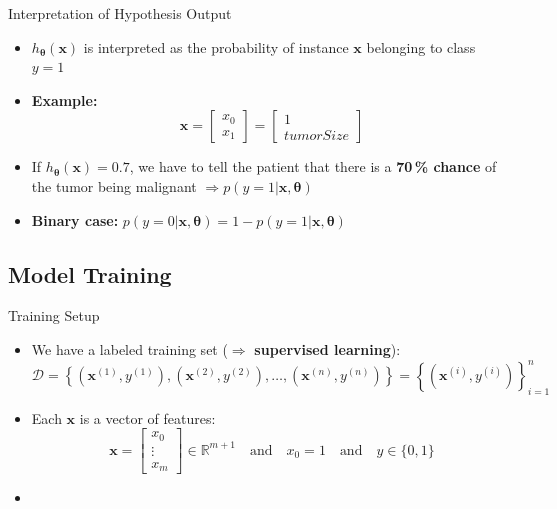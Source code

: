 \begin{frame}{Interpretation of Hypothesis Output}{}
	\begin{itemize}
		\item $h_{\bm{\theta}}(\bm{x})$ is interpreted as the probability of instance $\bm{x}$ belonging to class $y = 1$
		\item \textbf{Example:}
		\begin{equation}
			\bm{x} = \begin{bmatrix} x_0 \\ x_1 \end{bmatrix} = \begin{bmatrix} 1 \\ tumorSize \end{bmatrix}
		\end{equation}
		\vspace*{1mm}
		\item If $h_{\bm{\theta}}(\bm{x}) = 0.7$, we have to tell the patient that there
			is a \textbf{70\,\% chance} of the tumor being malignant $\Rightarrow p(y = 1 \vert \bm{x}, \bm{\theta})$
		\item \textbf{Binary case:} $p(y = 0 \vert \bm{x}, \bm{\theta}) = 1 - p(y = 1 \vert \bm{x}, \bm{\theta})$
	\end{itemize}
\end{frame}


\subsection{Model Training}

\begin{frame}{Training Setup}{}
	\begin{itemize}
		\item We have a labeled training set ($\Rightarrow$ \textbf{supervised learning}):
		\begin{equation}
			\mathcal{D} = 
				\left\{ (\bm{x}^{(1)}, y^{(1)}), (\bm{x}^{(2)}, y^{(2)}), \dots, (\bm{x}^{(n)}, y^{(n)}) \right\}
				= \left\{ (\bm{x}^{(i)}, y^{(i)}) \right\}_{i=1}^n
		\end{equation}
		\item Each $\bm{x}$ is a vector of features:
		\begin{equation}
			\bm{x} = \begin{bmatrix} x_0 \\ \vdots \\ x_{m} \end{bmatrix} \in \mathbb{R}^{m+1}
			\quad \text{and} \quad x_0 = 1 \quad \text{and} \quad y \in \{0, 1\}
		\end{equation}
		\item {}
	\end{itemize}
\end{frame}


